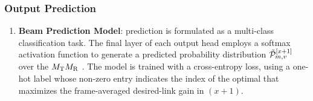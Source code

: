 \documentclass[10pt,journal,letterpaper]{journal_template/IEEEtran}
\newcommand{\rev}[1]{\textcolor{revisioncolor}{{}#1}}
\newif\ifshowdeletions
\newcommand{\currentdel}[1]{\ifshowdeletions\textcolor{deletioncolor}{\sout{#1}}\fi}
\theoremstyle{remark}
\begin{document}
\subsubsection{Output Prediction}

\currentdel{Although the beam-pair and channel-gain prediction share the same NN architecture, they are implemented as distinct models with independently trained weights:}
\begin{enumerate}[label=\arabic*.]
    \item \textbf{Beam Prediction Model}: \currentdel{The optimal beam-pair} prediction is formulated as a multi-class classification task. The final layer of each output head employs a softmax activation function to generate a predicted probability distribution $\Tilde{\mathcal{P}}_{m,v}^{[x+1]}$ over the $M_{\rm T}M_{\rm R}$ \currentdel{beam-pairs}.
    The model is trained with a cross-entropy loss, using a one-hot label whose non-zero entry indicates the index of the optimal \currentdel{beam-pair} that
    maximizes the \rev{frame-averaged }desired-link gain in \currentdel{frame-}$(x\!+\!1)$.
    

\end{enumerate}
\end{document}
